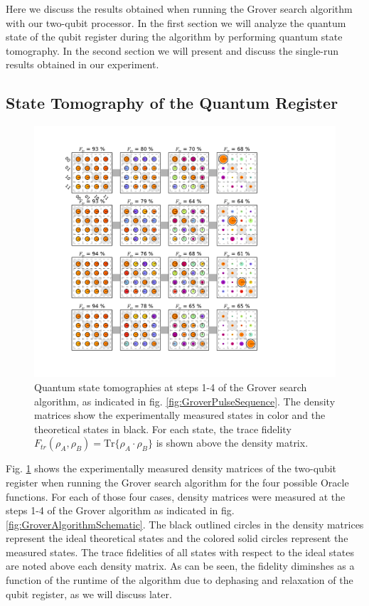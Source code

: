 Here we discuss the results obtained when running the Grover search algorithm with our two-qubit processor. In the first section we will analyze the quantum state of the qubit register during the algorithm by performing quantum state tomography. In the second section we will present and discuss the single-run results obtained in our experiment.

\subsection{State Tomography of the Quantum Register}

\begin{figure}[ht!]
	\centering
		\includegraphics[width=1.\textwidth]{"./data/ct5/2011_04_21 - grover and tomo/good_data/grover algorithm - summary"}
	\caption[Quantum state tomographies at different steps during the Grover search algorithm and single-run outcome probabilities]{Quantum state tomographies at steps 1-4 of the Grover search algorithm, as indicated in fig. \ref{fig:GroverPulseSequence}. The density matrices show the experimentally measured states in color and the theoretical states in black. For each state, the trace fidelity $F_{tr}(\rho_A,\rho_B) = \mathrm{Tr}\{\rho_A\cdot\rho_B\}$ is shown above the density matrix.}
	\label{fig:GroverAlgorithmExperimentalResults}
\end{figure}

Fig. \ref{fig:GroverAlgorithmExperimentalResults} shows the experimentally measured density matrices of the two-qubit register when running the Grover search algorithm for the four possible Oracle functions. For each of those four cases, density matrices were measured at the steps 1-4 of the Grover algorithm as indicated in fig. \ref{fig:GroverAlgorithmSchematic}. The black outlined circles in the density matrices represent the ideal theoretical states and the colored solid circles represent the measured states. The trace fidelities of all states with respect to the ideal states are noted above each density matrix. As can be seen, the fidelity diminshes as a function of the runtime of the algorithm due to dephasing and relaxation of the qubit register, as we will discuss later.

